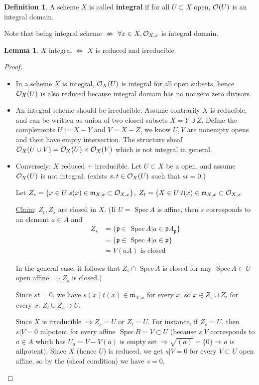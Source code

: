 \documentclass[11pt]{article}
\theoremstyle{definition}
\newtheorem{lemma}[thm]{Lemma}
\newtheorem{dfn}[thm]{Definition}
\newcommand{\spec}{\text{ Spec}\,}
\newcommand{\scm}{{\mathfrak m}}
\newcommand{\scp}{{\mathfrak p}}
\newcommand{\calo}{{\cal O}}
\newcommand{\Lrta}{\Longrightarrow}
\newcommand{\Llrta}{\Longleftrightarrow}
\begin{document}
\begin{dfn}
A scheme $X$ is called \textbf{integral} if for all $U\subset X$ open, $\calo(U)$ is an integral domain.
\end{dfn}
Note that being integral scheme $\not \Leftrightarrow$ $\forall x\in X,\calo_{X,x} $ is integral domain.
\begin{lemma}
$X$ integral $\Llrta$ $X$ is reduced and irreducible.
\end{lemma}
\begin{proof}\ 
\begin{itemize}
\item In a scheme $X$ is integral, $\calo_X(U)$ is integral for all open subsets, hence $\calo_X(U)$ is also reduced because integral domain has no nonzero zero divisors.

\item An integral scheme should be irreducible. Assume contrarily $X$ is reducible, and can be written as union of two closed subsets $X=Y\cup Z$. Define the complements $U:=X-Y$ and $V=X-Z$, we know $U,V$ are nonempty opens and their have empty intersection. The structure sheaf $\calo_X(U\cup V)=\calo_X(U)\times \calo_X(V)$ which is not integral in general.
\item Conversely: $X$ reduced + irreducible. Let $U\subset X$ be a open, and assume $\calo_X(U)$ is not integral. (exists $s,t\in\calo_X(U)$ such that $st=0$.)

Let $Z_s=\{x\in U| s(x)\in\scm_{X,x}\subset \calo_{X,x}\}$, $Z_t=\{X\in U|t(x)\in\scm_{X,x}\subset \calo_{X,x}$

\underline{Claim}: $Z_t,Z_s$ are closed in $X$. (If $U=\spec A$ is affine, then $s$ corresponds to an element $a\in A$ and
$$
\begin{aligned}
Z_s&=\{\scp\in\spec A| a\in\scp A_\scp\}\\
&=\{\scp\in\spec A|a\in\scp\}\\
&=V(a A)\text{ is  closed}
\end{aligned}
$$

In the general case, it follows that $Z_s\cap \spec A$ is closed for any $\spec A\subset U$ open affine $\Lrta Z_s$ is closed.)

Since $st=0$, we have $s(x)t(x)\in\scm_{X,x}$ for every $x$, so $x\in Z_s\cup Z_t$ for every $x$. $Z_t\cup Z_s\supset U$.

Since $X$ is irreducible $\Lrta Z_s=U$ or $Z_t=U$. For instance, if $Z_s=U$, then $s|V=0$ nilpotent for every affine $\spec B=V\subset U$ (because $s|V$ corresponds to $a\in A$ which has $U_a=V-V(a)$ is empty set $\Lrta \sqrt{(a)}=\{0\}\Lrta a$ is nilpotent). Since $X$ (hence $U$) is reduced, we get $s|V=0$ for every $V\subset U$ open affine, so by the (sheaf condition) we have $s=0$.
\end{itemize}
\end{proof}
\end{document}
